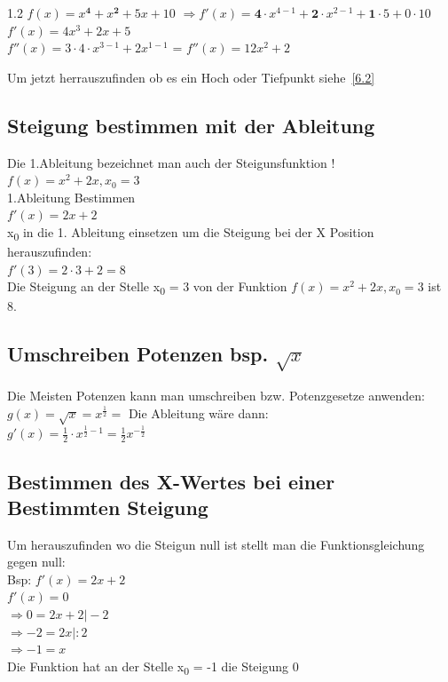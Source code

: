 \documentclass{article}
\newcommand{\Zeilenabstand}{1.2}
\begin{document}
\begin{spacing}{\Zeilenabstand}
                $f(x)= x\mathbf{^4}+ x\mathbf{^2} +5x +10$ $\Rightarrow f'(x)= \mathbf{4}\cdot x^{4-1} + \mathbf{2} \cdot x^{2-1} + \mathbf{1}\cdot 5 + 0 \cdot 10 $ \\
                $f'(x)= 4x^3+ 2x +5 $\\
                $f''(x)= 3 \cdot 4 \cdot x^{3-1} + 2x^{1-1} $ = $f''(x)=12x^2 +2 $

    Um jetzt herrauszufinden ob es ein Hoch oder Tiefpunkt siehe~\ref{6.2}

    

            \subsection{Steigung bestimmen mit der Ableitung}
                Die 1.Ableitung bezeichnet man auch der Steigunsfunktion !\\
                $f(x) = x^2 + 2x,x_0 = 3$\\
                1.Ableitung Bestimmen\\
                $f'(x) = 2x + 2 $\\
                x\textsubscript{0} in die 1. Ableitung einsetzen um die Steigung bei der X Position 
                herauszufinden:\\
                $f'(3)= 2 \cdot 3+ 2 = 8 $\\
                Die Steigung an der Stelle x\textsubscript{0} = 3 von der Funktion $f(x) = x^2 + 2x,x_0 = 3$ ist 8.

            \subsection{Umschreiben Potenzen bsp. ${\sqrt{x}} $}
                Die Meisten Potenzen kann man umschreiben bzw. Potenzgesetze anwenden:\\
                $g(x) = \sqrt{x} = x^{\frac{1}{2}} = $ Die Ableitung wäre dann:\\
                $g'(x) = \frac{1}{2} \cdot x^{\frac{1}{2}-1} = \frac{1}{2}x^{-\frac{1}{2}}$ %

            \subsection{Bestimmen des X-Wertes bei einer Bestimmten Steigung}
                Um herauszufinden wo die Steigun null ist stellt man die Funktionsgleichung gegen null:\\
                Bsp: 
                $ f'(x) = 2x + 2$\\
                $ f'(x) = 0 $\\
                $\Rightarrow0=2x+2  \vert -2 $\\
                $\Rightarrow -2= 2x \vert :2 $ \\
                $\Rightarrow -1 = x $\\
                Die Funktion hat an der Stelle x\textsubscript{0} = -1 die Steigung 0




\end{spacing}
\end{document}

